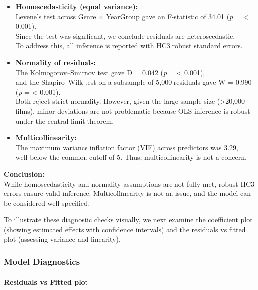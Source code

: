 \documentclass[
]{article}
\begin{document}
\begin{itemize}
\item
  \textbf{Homoscedasticity (equal variance):}\\
  Levene's test across Genre × YearGroup gave an F-statistic of 34.01
  (\emph{p} = \textless{} 0.001).\\
  Since the test was significant, we conclude residuals are
  heteroscedastic.\\
  To address this, all inference is reported with HC3 robust standard
  errors.
\item
  \textbf{Normality of residuals:}\\
  The Kolmogorov--Smirnov test gave D = 0.042 (\emph{p} = \textless{}
  0.001),\\
  and the Shapiro--Wilk test on a subsample of 5,000 residuals gave W =
  0.990 (\emph{p} = \textless{} 0.001).\\
  Both reject strict normality. However, given the large sample size
  (\textgreater20,000 films), minor deviations are not problematic
  because OLS inference is robust under the central limit theorem.
\item
  \textbf{Multicollinearity:}\\
  The maximum variance inflation factor (VIF) across predictors was
  3.29,\\
  well below the common cutoff of 5. Thus, multicollinearity is not a
  concern.
\end{itemize}

\textbf{Conclusion:}\\
While homoscedasticity and normality assumptions are not fully met,
robust HC3 errors ensure valid inference. Multicollinearity is not an
issue, and the model can be considered well-specified.

To illustrate these diagnostic checks visually, we next examine the
coefficient plot (showing estimated effects with confidence intervals)
and the residuals vs fitted plot (assessing variance and linearity).

\subsubsection{Model Diagnostics}\label{model-diagnostics}

\paragraph{Residuals vs Fitted plot}\label{residuals-vs-fitted-plot}
\end{document}
